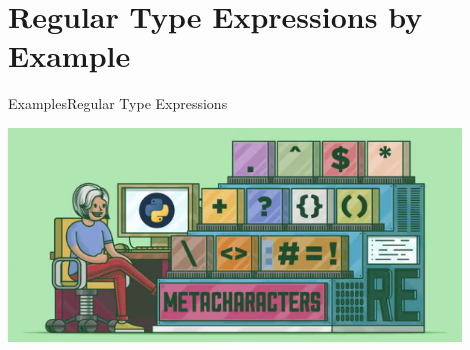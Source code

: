 \section{Regular Type Expressions by Example}

\begin{frame}{Examples}{Regular Type Expressions}
  \centering
  
  \includegraphics[width=0.9\textwidth]{regexp.png}
\end{frame}
